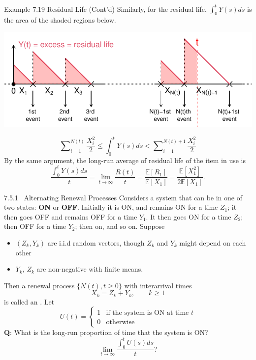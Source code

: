 \documentclass[letterpaper,handout, mathserif]{beamer}
\def\Sum{\sum\nolimits}
\def\E{\mathbb E}
\begin{document}
\begin{frame}{Example 7.19 Residual Life (Cont'd)}
Similarly, for the residual life, $\int_0^tY(s)ds$ is the area of the shaded regions below.
\begin{center}
\includegraphics[width=\textwidth]{L17_ResidualLifeArea.pdf}
\end{center}
$$
\Sum_{i=1}^{N(t)}\frac{X_i^2}{2} \le \int_0^tY(s)ds<\Sum_{i=1}^{N(t)+1}\frac{X_i^2}{2}
$$
By the same argument, the long-run average of residual life of the item in
use is
$$
\frac{\int_0^tY(s)ds}{t}
= \lim_{t\to\infty}\dfrac{R(t)}{t}
=\dfrac{\E[R_1]}{\E[X_1]}=\frac{\E[X_1^2]}{2\E[X_1]}.
$$
\end{frame}
\begin{frame}{7.5.1 ~Alternating Renewal Processes}
Considers a system that can be in one of two states: {\bf ON} or {\bf OFF}.
Initially it is ON, and remains ON for a time $Z_1$; it then goes OFF
and remains OFF for a time $Y_1$. It then goes ON for a time $Z_2$;
then OFF for a time $Y_2$; then on, and so on. Suppose
\begin{itemize}
\item $(Z_k,Y_k)$ are i.i.d random vectors, though $Z_k$ and $Y_k$ might depend on each other
\item $Y_k$, $Z_k$ are non-negative with finite means.
\end{itemize}
Then a renewal process $\{N(t),t \ge 0\}$ with interarrival times
$$X_k= Z_k+ Y_k,\qquad k \ge 1$$
is called an .
Let
$$
U(t) =
\begin{cases}
1 & \text{if the system is ON at time }t\\
0 & \text{otherwise}
\end{cases}
$$
{\bf Q}: What is the long-run proportion of time that the system is ON?
$$
\lim_{t\to\infty} \frac{\int_0^t U(s)ds}{t}?
$$
\end{frame}
\end{document}
